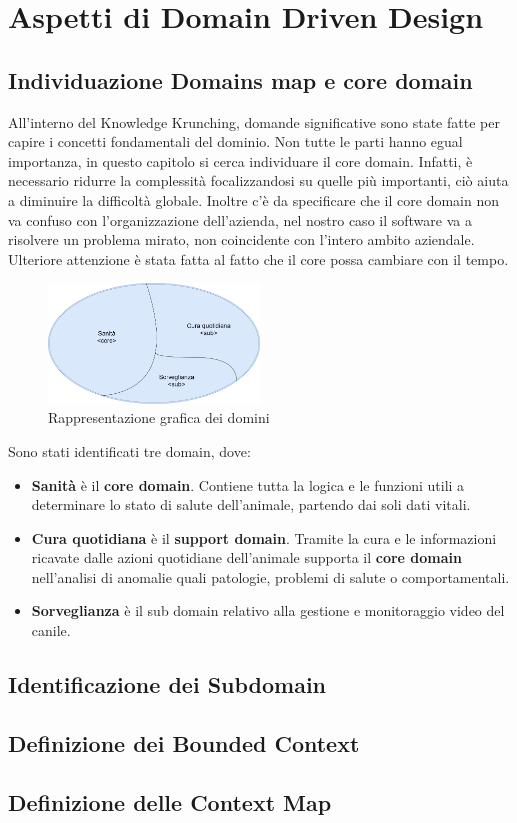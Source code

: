 \chapter{Aspetti di Domain Driven Design}
    \section{Individuazione Domains map e core domain}	
    All'interno del Knowledge Krunching, domande significative sono state fatte per capire i concetti fondamentali del dominio.
    Non tutte le parti hanno egual importanza, in questo capitolo si cerca individuare il core domain. Infatti, è necessario ridurre la complessità focalizzandosi su quelle più importanti, ciò aiuta a diminuire la difficoltà globale.
    Inoltre c'è da specificare che il core domain non va confuso con l’organizzazione dell'azienda, nel nostro caso il software va a risolvere un problema mirato, non coincidente con l'intero ambito aziendale.
    Ulteriore attenzione è stata fatta al fatto che il core possa cambiare con il tempo.
    
    \begin{figure}[ht]
        \caption{Rappresentazione grafica dei domini}
        \centering
        \includegraphics[width=0.5\textwidth]{DrawIo/domainsMap.png}
    \end{figure}
    

    Sono stati identificati tre domain, dove:
    
    \begin{itemize}
        \item \textbf{Sanità} è il \textbf{core domain}. Contiene tutta la logica e le funzioni utili a determinare lo stato di salute dell'animale, partendo dai soli dati vitali.
        
        \item \textbf{Cura quotidiana} è il \textbf{support domain}. Tramite la cura e le informazioni ricavate dalle azioni quotidiane dell'animale supporta il \textbf{core domain} nell'analisi di anomalie quali patologie, problemi di salute o comportamentali.
        
        \item \textbf{Sorveglianza} è il sub domain relativo alla gestione e monitoraggio video del canile.
    \end{itemize}
    \section{Identificazione dei Subdomain}
    \section{Definizione dei Bounded Context}
    \section{Definizione delle Context Map}
